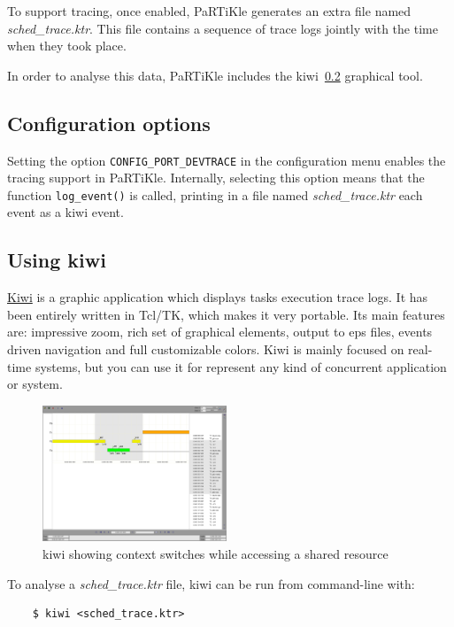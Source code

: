 \documentclass[a4paper,10pt,twoside]{report}
\begin{document}
To support tracing, once enabled, PaRTiKle generates an extra file
named \textit{sched\_trace.ktr}. This file contains a sequence of
trace logs jointly with the time when they took place.

In order to analyse this data, PaRTiKle includes the
kiwi~\ref{kiwi} graphical tool.

\subsection{Configuration options}

Setting the option \verb+CONFIG_PORT_DEVTRACE+ in the configuration menu
enables the tracing support in PaRTiKle. Internally, selecting this
option means that the function \texttt{log\_event()} is called,
printing in a file named \textit{sched\_trace.ktr} each event as a
kiwi event.

\subsection{Using kiwi}\label{kiwi}

\href{http://rtportal.upv.es/apps/kiwi/}{Kiwi}
is a graphic application which displays tasks execution trace logs.
It has been entirely written in Tcl/TK, which makes it very portable.
Its main features are: impressive zoom, rich set of graphical elements,
output to eps files, events driven navigation and full customizable colors.
Kiwi is mainly focused on real-time systems,
but you can use it for represent any kind of concurrent application or system.

\begin{figure}[htbp]\centering
\includegraphics[width=0.49\textwidth]{img/kiwi}
\caption{kiwi showing context switches while accessing a shared resource}
\label{img:kiwi}
\end{figure}


To analyse a \textit{sched\_trace.ktr} file, kiwi can be run from command-line with:
\begin{verbatim}
    $ kiwi <sched_trace.ktr>
\end{verbatim}
\end{document}
